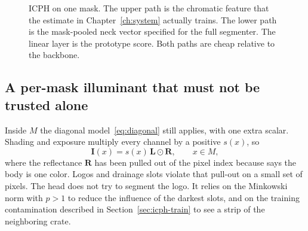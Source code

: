 \begin{figure}[t]
\centering
{}
\caption{ICPH on one mask. The upper path is the chromatic feature that the estimate in Chapter~\ref{ch:system} actually trains. The lower path is the mask-pooled neck vector specified for the full segmenter. The linear layer is the prototype score. Both paths are cheap relative to the backbone.}
\label{fig:icph-block}
\end{figure}

\subsection{A per-mask illuminant that must not be trusted alone}
\label{sec:icph-illum}

Inside $M$ the diagonal model~\eqref{eq:diagonal} still applies, with one extra scalar. Shading and exposure multiply every channel by a positive $s(x)$, so
\begin{equation}
\mathbf{I}(x) = s(x)\, \mathbf{L} \odot \mathbf{R},
\qquad x\in M,
\label{eq:shaded}
\end{equation}
where the reflectance $\mathbf{R}$ has been pulled out of the pixel index because  says the body is one color. Logos and drainage slots violate that pull-out on a small set of pixels. The head does not try to segment the logo. It relies on the Minkowski norm with $p>1$ to reduce the influence of the darkest slots, and on the training contamination described in Section~\ref{sec:icph-train} to see a strip of the neighboring crate.

